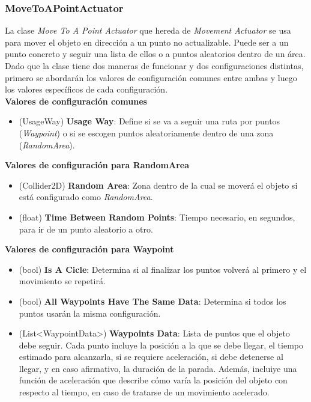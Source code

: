 \subsubsection{MoveToAPointActuator}
La clase \textit{Move To A Point Actuator} que hereda de \textit{Movement Actuator} se usa para mover el objeto en dirección a un punto no actualizable. Puede ser a un punto concreto y seguir una lista de ellos o a puntos aleatorios dentro de un área.\\
Dado que la clase tiene dos maneras de funcionar y dos configuraciones distintas, primero se abordarán los valores de configuración comunes entre ambas y luego los valores específicos de cada configuración.\\

\textbf{Valores de configuración comunes}
\begin{itemize} 
	\item (UsageWay) \textbf{Usage Way}: Define si se va a seguir una ruta por puntos (\textit{Waypoint}) o si se escogen puntos aleatoriamente dentro de una zona (\textit{RandomArea}).
\end{itemize}

\textbf{Valores de configuración para RandomArea}
\begin{itemize} 	
	\item (Collider2D) \textbf{Random Area}: Zona dentro de la cual se moverá el objeto si está configurado como \textit{RandomArea}. 
	\item (float) \textbf{Time Between Random Points}: Tiempo necesario, en segundos, para ir de un punto aleatorio a otro.
\end{itemize}

\textbf{Valores de configuración para Waypoint}
\begin{itemize} 	
	\item (bool) \textbf{Is A Cicle}: Determina si al finalizar los puntos volverá al primero y el movimiento se repetirá.
	\item (bool) \textbf{All Waypoints Have The Same Data}: Determina si todos los puntos usarán la misma configuración.
	\item (List<WaypointData>) \textbf{Waypoints Data}: Lista de puntos que el objeto debe seguir. Cada punto incluye la posición a la que se debe llegar, el tiempo estimado para alcanzarla, si se requiere aceleración, si debe detenerse al llegar, y en caso afirmativo, la duración de la parada. Además, incluiye una función de aceleración que describe cómo varía la posición del objeto con respecto al tiempo, en caso de tratarse de un movimiento acelerado.
\end{itemize}

